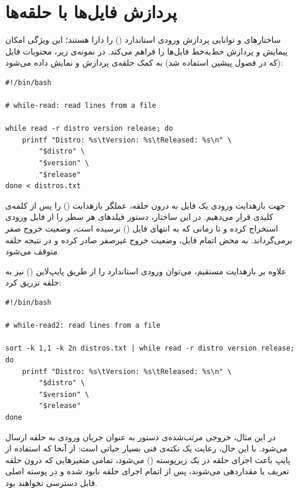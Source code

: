 \section{پردازش فایل‌ها با حلقه‌ها}

ساختارهای  و  توانایی پردازش ورودی استاندارد () را دارا هستند؛ این ویژگی امکان پیمایش و پردازش خط‌به‌خط فایل‌ها را فراهم می‌کند. در نمونه‌ی زیر، محتویات فایل  (که در فصول پیشین استفاده شد) به کمک حلقه‌ی  پردازش و نمایش داده می‌شود:

\begin{latin}
\begin{lstlisting}
#!/bin/bash

# while-read: read lines from a file

while read -r distro version release; do
    printf "Distro: %s\tVersion: %s\tReleased: %s\n" \
        "$distro" \
        "$version" \
        "$release"
done < distros.txt
\end{lstlisting}
\end{latin}

جهت بازهدایت ورودی یک فایل به درون حلقه، عملگر بازهدایت (\cmd{<}) را پس از کلمه‌ی کلیدی  قرار می‌دهیم. در این ساختار، دستور  فیلدهای هر سطر را از فایل ورودی استخراج کرده و تا زمانی که به انتهای فایل () نرسیده است، وضعیت خروج صفر برمی‌گرداند. به محض اتمام فایل،  وضعیت خروج غیرصفر صادر کرده و در نتیجه حلقه متوقف می‌شود.

علاوه بر بازهدایت مستقیم، می‌توان ورودی استاندارد را از طریق پایپ‌لاین (\en{Pipeline}) نیز به حلقه تزریق کرد:

\begin{latin}
\begin{lstlisting}
#!/bin/bash

# while-read2: read lines from a file

sort -k 1,1 -k 2n distros.txt | while read -r distro version release; do
    printf "Distro: %s\tVersion: %s\tReleased: %s\n" \
        "$distro" \
        "$version" \
        "$release"
done
\end{lstlisting}
\end{latin}

در این مثال، خروجی مرتب‌شده‌ی دستور  به عنوان جریان ورودی به حلقه ارسال می‌شود. با این حال، رعایت یک نکته‌ی فنی بسیار حیاتی است: از آنجا که استفاده از پایپ باعث اجرای حلقه در یک زیرپوسته () می‌شود، تمامی متغیرهایی که درون حلقه تعریف یا مقداردهی می‌شوند، پس از اتمام اجرای حلقه نابود شده و در پوسته اصلی قابل دسترسی نخواهند بود.

